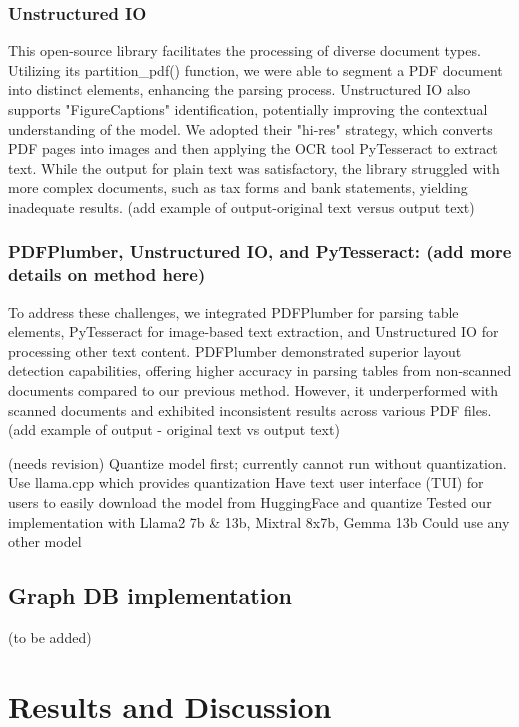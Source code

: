 \documentclass{scrartcl}
\begin{document}
\subsubsection{Unstructured IO} 
This open-source library facilitates the processing of diverse document types. Utilizing its partition_pdf() function, we were able to segment a PDF document into distinct elements, enhancing the parsing process. Unstructured IO also supports "FigureCaptions" identification, potentially improving the contextual understanding of the model. We adopted their "hi-res" strategy, which converts PDF pages into images and then applying the OCR tool PyTesseract to extract text. 
While the output for plain text was satisfactory, the library struggled with more complex documents, such as tax forms and bank statements, yielding inadequate results.
(add example of output-original text versus output text)
\subsubsection{PDFPlumber, Unstructured IO, and PyTesseract: (add more details on method here)}
To address these challenges, we integrated PDFPlumber for parsing table elements, PyTesseract for image-based text extraction, and Unstructured IO for processing other text content. PDFPlumber demonstrated superior layout detection capabilities, offering higher accuracy in parsing tables from non-scanned documents compared to our previous method. However, it underperformed with scanned documents and exhibited inconsistent results across various PDF files.
(add example of output - original text vs output text)

(needs revision) Quantize model first; currently cannot run without quantization. 
Use llama.cpp which provides quantization 
Have text user interface (TUI) for users to easily download the model from HuggingFace and quantize
Tested our implementation with Llama2 7b & 13b, Mixtral 8x7b, Gemma 13b
Could use any other model

\subsection{Graph DB implementation}
(to be added)
\section{Results and Discussion}
\end{document}
